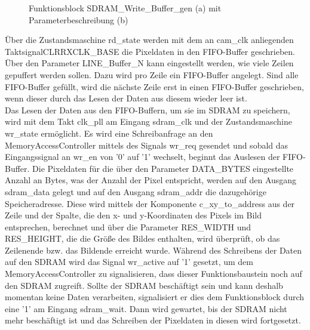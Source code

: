 \documentclass[ngerman,12pt]{article} %
\begin{document}
{\begin{figure}[h!tb]
  \centering
  \qquad
  \caption[Funktionsblock SDRAM\_Write\_Buffer\_gen mit Parameterbeschreibung]{\label{pic:SDRAM_Write_Buffer_gen}Funktionsblock  SDRAM\_Write\_Buffer\_gen (a) mit Parameterbeschreibung (b)}
\end{figure}

Über die Zustandsmaschine rd\_state werden mit dem an cam\_clk anliegenden TaktsignalCLRRXCLK\_BASE die Pixeldaten in den FIFO-Buffer geschrieben. Über den Parameter LINE\_Buffer\_N kann eingestellt werden, wie viele Zeilen gepuffert werden sollen. Dazu wird pro Zeile ein FIFO-Buffer angelegt. Sind alle FIFO-Buffer gefüllt, wird die nächste Zeile erst in einen FIFO-Buffer geschrieben, wenn dieser durch das Lesen der Daten aus diesem wieder leer ist.\\ 
Das Lesen der Daten aus den FIFO-Buffern, um sie im SDRAM zu speichern, wird mit dem Takt clk\_pll am Eingang sdram\_clk und der Zustandsmaschine wr\_state ermöglicht. Es wird eine Schreibanfrage an den MemoryAccessController mittels des Signals wr\_req gesendet und sobald das Eingangssignal an wr\_en von '0' auf '1' wechselt, beginnt das Auslesen der FIFO-Buffer. Die Pixeldaten für die über den Parameter DATA\_BYTES eingestellte Anzahl an Bytes, was der Anzahl der Pixel entspricht, werden auf den Ausgang sdram\_data gelegt und auf den Ausgang sdram\_addr die dazugehörige Speicheradresse. Diese wird mittels der Komponente c\_xy\_to\_address aus der Zeile und der Spalte, die den x- und y-Koordinaten des Pixels im Bild entsprechen, berechnet und über die Parameter RES\_WIDTH und RES\_HEIGHT, die die Größe des Bildes enthalten, wird überprüft, ob das Zeilenende bzw. das Bildende erreicht wurde. Während des Schreibens der Daten auf den SDRAM wird das Signal wr\_active auf '1' gesetzt, um dem MemoryAccessController zu signalisieren, dass dieser Funktionsbaustein noch auf den SDRAM zugreift. Sollte der SDRAM beschäftigt sein und kann deshalb momentan keine Daten verarbeiten, signalisiert er dies dem Funktionsblock durch eine '1' am Eingang sdram\_wait. Dann wird gewartet, bis der SDRAM nicht mehr beschäftigt ist und das Schreiben der Pixeldaten in diesen wird fortgesetzt.



}
\end{document}
